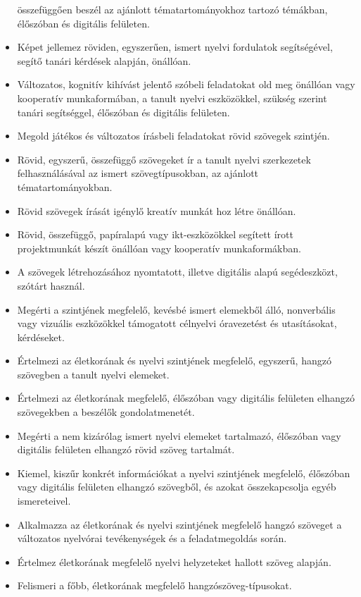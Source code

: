 \begin{itemize}
  összefüggően beszél az ajánlott tématartományokhoz tartozó témákban,
  élőszóban és digitális felületen.
\item
  Képet jellemez röviden, egyszerűen, ismert nyelvi fordulatok
  segítségével, segítő tanári kérdések alapján, önállóan.
\item
  Változatos, kognitív kihívást jelentő szóbeli feladatokat old meg
  önállóan vagy kooperatív munkaformában, a tanult nyelvi eszközökkel,
  szükség szerint tanári segítséggel, élőszóban és digitális felületen.
\item
  Megold játékos és változatos írásbeli feladatokat rövid szövegek
  szintjén.
\item
  Rövid, egyszerű, összefüggő szövegeket ír a tanult nyelvi szerkezetek
  felhasználásával az ismert szövegtípusokban, az ajánlott
  tématartományokban.
\item
  Rövid szövegek írását igénylő kreatív munkát hoz létre önállóan.
\item
  Rövid, összefüggő, papíralapú vagy ikt-eszközökkel segített írott
  projektmunkát készít önállóan vagy kooperatív munkaformákban.
\item
  A szövegek létrehozásához nyomtatott, illetve digitális alapú
  segédeszközt, szótárt használ.
\item
  Megérti a szintjének megfelelő, kevésbé ismert elemekből álló,
  nonverbális vagy vizuális eszközökkel támogatott célnyelvi óravezetést
  és utasításokat, kérdéseket.
\item
  Értelmezi az életkorának és nyelvi szintjének megfelelő, egyszerű,
  hangzó szövegben a tanult nyelvi elemeket.
\item
  Értelmezi az életkorának megfelelő, élőszóban vagy digitális felületen
  elhangzó szövegekben a beszélők gondolatmenetét.
\item
  Megérti a nem kizárólag ismert nyelvi elemeket tartalmazó, élőszóban
  vagy digitális felületen elhangzó rövid szöveg tartalmát.
\item
  Kiemel, kiszűr konkrét információkat a nyelvi szintjének megfelelő,
  élőszóban vagy digitális felületen elhangzó szövegből, és azokat
  összekapcsolja egyéb ismereteivel.
\item
  Alkalmazza az életkorának és nyelvi szintjének megfelelő hangzó
  szöveget a változatos nyelvórai tevékenységek és a feladatmegoldás
  során.
\item
  Értelmez életkorának megfelelő nyelvi helyzeteket hallott szöveg
  alapján.
\item
  Felismeri a főbb, életkorának megfelelő hangzószöveg-típusokat.

\end{itemize}
